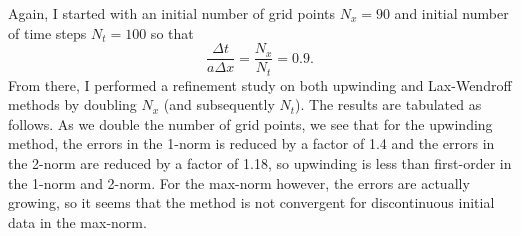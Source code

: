 \documentclass[12pt]{article}
\begin{document}
Again, I started with an initial number of grid points $N_x = 90$ and initial number of time steps $N_t = 100$ so that $$\dfrac{\Delta t}{a\Delta x} = \dfrac{N_x}{N_t} = 0.9.$$
From there, I performed a refinement study on both upwinding and Lax-Wendroff methods by doubling $N_x$ (and subsequently $N_t$).  The results are tabulated as follows. As we double the number of grid points, we see that for the upwinding method, the errors in the 1-norm is reduced by a factor of 1.4 and the errors in the 2-norm are reduced by a factor of 1.18, so upwinding is less than first-order in the 1-norm and 2-norm.  For the max-norm however, the errors are actually growing, so it seems that the method is not convergent for discontinuous initial data in the max-norm.

\end{document}
